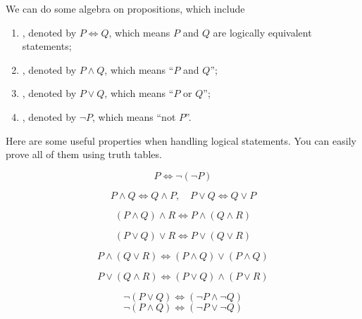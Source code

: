 We can do some algebra on propositions, which include
\begin{enumerate}[label=(\roman*)]
\item {}, denoted by $P\iff Q$, which means $P$ and $Q$ are logically equivalent statements;

\item {}, denoted by $P\land Q$, which means ``$P$ and $Q$'';

\item {}, denoted by $P\lor Q$, which means ``$P$ or $Q$'';

\item {}, denoted by $\lnot P$, which means ``not $P$''.
\end{enumerate}

Here are some useful properties when handling logical statements. You can easily prove all of them using truth tables.
\begin{proposition}
\[P\iff\lnot(\lnot P)\]
\end{proposition}

\begin{proposition}
\[ P \land Q \iff Q \land P, \quad P \lor Q \iff Q \lor P \]
\end{proposition}

\begin{proposition}
\[ (P\land Q)\land R \iff P\land (Q\land R) \]
\end{proposition}

\begin{proposition}
\[ (P\lor Q)\lor R \iff P\lor (Q\lor R) \]
\end{proposition}

\begin{proposition}
\[ P\land(Q\lor R) \iff (P\land Q)\lor(P\land Q) \]
\end{proposition}

\begin{proposition}
\[ P\lor(Q\land R) \iff (P\lor Q)\land(P\lor R) \]
\end{proposition}

\begin{proposition}
\[ \lnot(P \lor Q) \iff (\lnot P \land \lnot Q) \]
\[ \lnot (P\land Q) \iff (\lnot P\lor \lnot Q) \]
\end{proposition}

